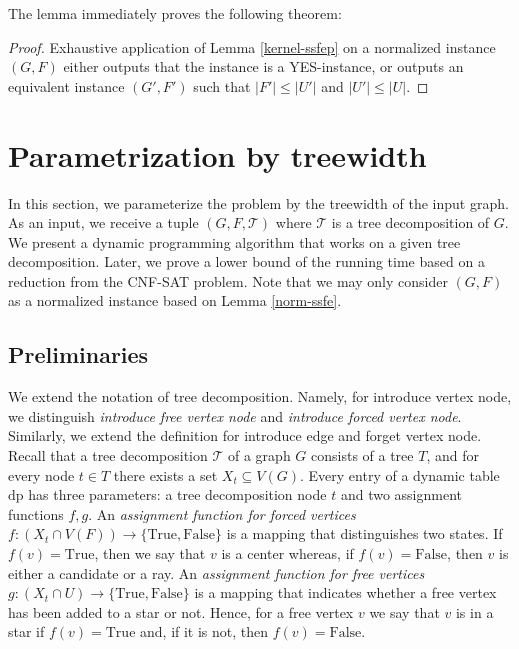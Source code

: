 \documentclass[en]{pracamgr}
\theoremstyle{definition}
\newcommand{\cnfsat}{{\sc CNF-SAT}}
\newcommand{\true}{\textrm{True}}
\newcommand{\false}{\textrm{False}}
\begin{document}
The lemma immediately proves the following theorem:

\thmssfepkernel*

\begin{proof}
	Exhaustive application of Lemma \ref{kernel-ssfep} on a normalized instance $(G,F)$ either outputs that the instance is a YES-instance, or outputs an equivalent instance $(G',F')$ such that $|F'| \leq |U'|$ and $|U'| \leq |U|$.
\end{proof}

\section{Parametrization by treewidth}

In this section, we parameterize the problem by the treewidth of the input graph. As an input, we receive a tuple $(G,F,\mathcal{T})$ where $\mathcal{T}$ is a tree decomposition of $G$. We present a dynamic programming algorithm that works on a given tree decomposition. Later, we prove a lower bound of the running time based on a reduction from the \cnfsat{} problem. Note that we may only consider $(G,F)$ as a normalized instance based on Lemma \ref{norm-ssfe}.

\subsection{Preliminaries}

We extend the notation of tree decomposition. Namely, for introduce vertex node, we distinguish \textit{introduce free vertex node} and \textit{introduce forced vertex node}. Similarly, we extend the definition for introduce edge and forget vertex node. Recall that a tree decomposition $\mathcal{T}$ of a graph $G$ consists of a tree $T$, and for every node $t \in T$ there exists a set $X_t \subseteq V(G)$. Every entry of a dynamic table $\text{dp}$ has three parameters: a tree decomposition node $t$ and two assignment functions $f,g$. An \textit{assignment function for forced vertices} $f: (X_t \cap V(F)) \rightarrow \{\true, \false\}$ is a mapping that distinguishes two states. If $f(v)=\true$, then we say that $v$ is a center whereas, if $f(v)=\false$, then $v$ is either a candidate or a ray. An \textit{assignment function for free vertices} $g: (X_t \cap U) \rightarrow \{\true, \false\}$ is a mapping that indicates whether a free vertex has been added to a star or not. Hence, for a free vertex $v$ we say that $v$ is in a star if $f(v)=\true$ and, if it is not, then $f(v)=\false$.
\end{document}
